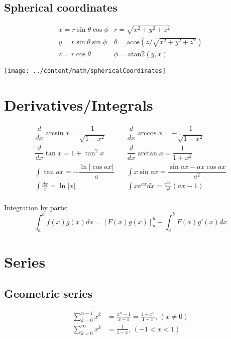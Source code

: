 \subsection{Spherical coordinates}
\begin{minipage}{75mm}
$$\begin{array}{cc}
x = r\sin\theta\cos\phi & r = \sqrt{x^2+y^2+z^2}\\
y = r\sin\theta\sin\phi & \theta = \textrm{acos}(z/\sqrt{x^2+y^2+z^2})\\
z = r\cos\theta & \phi = \textrm{atan2}(y,x)
\end{array}$$
\end{minipage}
\begin{minipage}{15mm}
\texttt{[image: ../content/math/sphericalCoordinates]}
\end{minipage}


\section{Derivatives/Integrals}
\begin{align*}
\dfrac{d}{dx}\arcsin x = \dfrac{1}{\sqrt{1-x^2}} & \quad
\dfrac{d}{dx}\arccos x = -\dfrac{1}{\sqrt{1-x^2}}\\
\dfrac{d}{dx}\tan x = 1+\tan^2 x & \quad
\dfrac{d}{dx}\arctan x = \dfrac{1}{1+x^2}\\
\int\tan ax = -\dfrac{\ln|\cos ax|}{a} & \quad
\int x\sin ax = \dfrac{\sin ax-ax \cos ax}{a^2}\\
\int \frac{dx}{x} = \ln|x| & \quad
\int xe^{ax}dx = \frac{e^{ax}}{a^2}(ax-1)\\
\end{align*}

Integration by parts:
$$\int_a^bf(x)g(x)dx = [F(x)g(x)]_a^b-\int_a^bF(x)g'(x)dx$$

\section{Series} 
\subsection{Geometric series}
\begin{align*}
\sum_{k=0}^{n-1}x^k &= \frac{x^n-1}{x-1} = \frac{1-x^n}{1-x},\,(x\neq0)\\
\sum_{k=0}^{\infty}x^k &= \frac{1}{1-x},\,(-1<x<1)\\
\end{align*}

